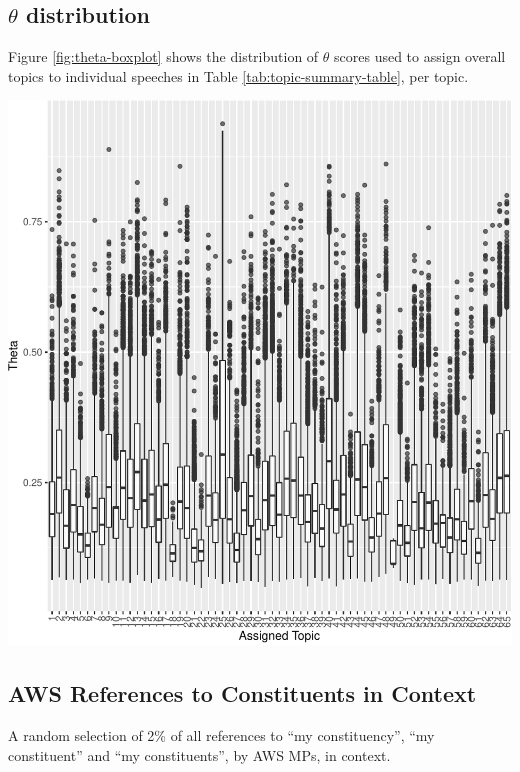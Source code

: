 \documentclass[]{article}
\let\origfigure\figure
\let\endorigfigure\endfigure
\renewenvironment{figure}[1][2] {
    \expandafter\origfigure\expandafter[H]
} {
    \endorigfigure
}
\theoremstyle{definition}
\theoremstyle{definition}
\theoremstyle{definition}
\theoremstyle{remark}
\begin{document}
\hypertarget{theta-distribution}{%
\subsection{\texorpdfstring{\(\theta\)
distribution}{\textbackslash{}theta distribution}}\label{theta-distribution}}

Figure \ref{fig:theta-boxplot} shows the distribution of \(\theta\)
scores used to assign overall topics to individual speeches in Table
\ref{tab:topic-summary-table}, per topic.

\begin{figure}
\centering
\includegraphics{methodology_files/figure-latex/theta-boxplot-1.pdf}
\caption{\label{fig:theta-boxplot}Theta Values in Topic Assignment}
\end{figure}

\hypertarget{aws-references-to-constituents-in-context}{%
\subsection{AWS References to Constituents in
Context}\label{aws-references-to-constituents-in-context}}

A random selection of 2\% of all references to ``my constituency'', ``my
constituent'' and ``my constituents'', by AWS MPs, in context.
\end{document}
